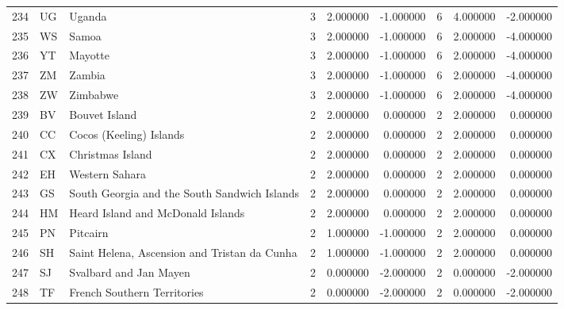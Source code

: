\begin{tabular}{lllrrrrrr}
234 & UG & Uganda & 3 & 2.000000 & -1.000000 & 6 & 4.000000 & -2.000000 \\
235 & WS & Samoa & 3 & 2.000000 & -1.000000 & 6 & 2.000000 & -4.000000 \\
236 & YT & Mayotte & 3 & 2.000000 & -1.000000 & 6 & 2.000000 & -4.000000 \\
237 & ZM & Zambia & 3 & 2.000000 & -1.000000 & 6 & 2.000000 & -4.000000 \\
238 & ZW & Zimbabwe & 3 & 2.000000 & -1.000000 & 6 & 2.000000 & -4.000000 \\
239 & BV & Bouvet Island & 2 & 2.000000 & 0.000000 & 2 & 2.000000 & 0.000000 \\
240 & CC & Cocos (Keeling) Islands & 2 & 2.000000 & 0.000000 & 2 & 2.000000 & 0.000000 \\
241 & CX & Christmas Island & 2 & 2.000000 & 0.000000 & 2 & 2.000000 & 0.000000 \\
242 & EH & Western Sahara & 2 & 2.000000 & 0.000000 & 2 & 2.000000 & 0.000000 \\
243 & GS & South Georgia and the South Sandwich Islands & 2 & 2.000000 & 0.000000 & 2 & 2.000000 & 0.000000 \\
244 & HM & Heard Island and McDonald Islands & 2 & 2.000000 & 0.000000 & 2 & 2.000000 & 0.000000 \\
245 & PN & Pitcairn & 2 & 1.000000 & -1.000000 & 2 & 2.000000 & 0.000000 \\
246 & SH & Saint Helena, Ascension and Tristan da Cunha & 2 & 1.000000 & -1.000000 & 2 & 2.000000 & 0.000000 \\
247 & SJ & Svalbard and Jan Mayen & 2 & 0.000000 & -2.000000 & 2 & 0.000000 & -2.000000 \\
248 & TF & French Southern Territories & 2 & 0.000000 & -2.000000 & 2 & 0.000000 & -2.000000 \\
\end{tabular}


